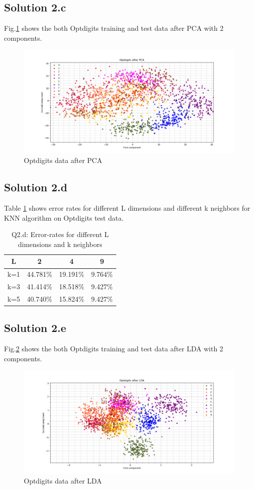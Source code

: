 \subsection*{Solution 2.c}
Fig.\ref{fig:optdigits_pca} shows the both Optdigits training and test data after PCA with 2 components.
\begin{figure}[h!]
	\centering
	\includegraphics[scale=0.5]{optdigits_pca}
	\caption{Optdigits data after PCA}
	\label{fig:optdigits_pca}
\end{figure}
\subsection*{Solution 2.d}
Table \ref{tbl:l_k_error_2d} shows error rates for different L dimensions and different k neighbors for KNN algorithm on Optdigits test data.
\begin{table}[!h]
\begin{center}
	\begin{tabular}{||c | c | c | c||} 
		\hline
		L & 2 & 4 & 9 \\ [0.5ex] 
		\hline\hline
		k=1 & 44.781\% & 19.191\% &9.764\% \\
		\hline
		k=3 & 41.414\% &18.518\% & 9.427\% \\
		\hline
		k=5 & 40.740\% & 15.824\% & 9.427\% \\ [1ex]
		\hline
	\end{tabular}
\caption{Q2.d: Error-rates for different L dimensions and k neighbors}
\label{tbl:l_k_error_2d}
\end{center}
\end{table}
\subsection*{Solution 2.e}
Fig.\ref{fig:optdigits_lda} shows the both Optdigits training and test data after LDA with 2 components.
\newpage
\begin{figure}[h!]
	\centering
	\includegraphics[scale=0.5]{optdigits_lda}
	\caption{Optdigits data after LDA}
	\label{fig:optdigits_lda}
\end{figure}